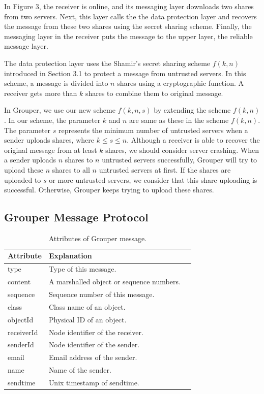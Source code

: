 \documentclass[twocolumn,10pt]{article}
\begin{document}
In Figure 3, the receiver is online, and its messaging layer downloads two shares from two servers.
Next, this layer calls the the data protection layer and recovers the message from these two shares using the secret sharing scheme.
Finally, the messaging layer in the receiver puts the message to the upper layer, the reliable message layer.

The data protection layer uses the Shamir's secret sharing scheme $f(k, n)$ introduced in Section 3.1 to protect a message from untrusted servers.
In this scheme, a message is divided into $n$ shares using a cryptographic function.
A receiver gets more than $k$ shares to combine them to original message.

In Grouper, we use our new scheme $ f(k, n, s)$ by extending the scheme $f(k, n)$.
In our scheme, the parameter $k$ and $n$ are same as these in the scheme $f(k, n)$. 
The parameter $s$ represents the minimum number of untrusted servers when a sender uploads shares, where $k \leq s \leq n$.
Although a receiver is able to recover the original message from at least $k$ shares, we should consider server crashing. 
When a sender uploads $n$ shares to $n$ untrusted servers successfully, Grouper will try to upload these $n$ shares to all $n$ untrusted servers at first. 
If the shares are uploaded to $s$ or more untrusted servers, we consider that this share uploading is successful.
Otherwise, Grouper keeps trying to upload these shares.

\subsection{Grouper Message Protocol}

\begin{table}[t]
	\centering
	\caption{Attributes of Grouper message.}
	\label{my-label}
	\begin{tabular}{lll}
		\hline
		\textbf{Attribute} & \textbf{Explanation} \\ \hline
		type & Type of this message. \\
		content & A marshalled object or sequence numbers. \\
		sequence & Sequence number of this message. \\
		class & Class name of an object. \\
		objectId & Physical ID of an object. \\
		receiverId & Node identifier of the receiver. \\
		senderId & Node identifier of the sender. \\
		email & Email address of the sender. \\
		name & Name of the sender. \\
		sendtime & Unix timestamp of sendtime. \\
		\hline
	\end{tabular}
\end{table}
\end{document}
